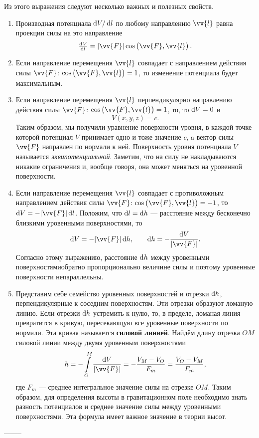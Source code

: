 \documentclass[11pt, a4paper]{article}
\theoremstyle{plain}
\theoremstyle{definition}
\theoremstyle{remark}
\begin{document}
Из этого выражения следуют несколько важных и полезных свойств.
\begin{enumerate}
    \item Производная потенциала $\dif V/ \dif l$ по любому направлению $\vv{l}$ равна проекции силы на
        это направление
        \begin{equation*}
            \od{V}{l} =  |\vv{F}|\cos \left(\vv{F}, \vv{l}\right).
        \end{equation*}
    \item Если направление перемещения $\vv{l}$ совпадает с направлением действия силы $\vv{F}$: $\cos\left( \vv{F}, \vv{l} \right) = 1$, то изменение потенциала будет максимальным.
    \item Если направление перемещения $\vv{l}$ перпендикулярно направлению действия силы $\vv{F}$: $\cos\left( \vv{F}, \vv{l} \right) = 1$, то, то $\dif V = 0$ и 
        \begin{equation*}
            V\left( x, y, z \right) = c.
        \end{equation*}
        Таким образом, мы получили уравнение поверхности уровня, в каждой точке которой потенциал $V$ принимает одно и тоже значение $c$, a вектор силы $\vv{F}$ направлен по нормали к ней. Поверхность уровня потенциала $V$ называется \textit{эквипотенциальной}. Заметим, что на силу не накладываются никакие ограничения и, вообще говоря, она может меняться на уровенной поверхности.
    \item Если направление перемещения $\vv{l}$ совпадает с противоложным направлением действия силы $\vv{F}$: $\cos\left( \vv{F}, \vv{l} \right) = -1$, то $\dif V = - |\vv{F}| \dif l$. Положим, что $\dif l = \dif h$ --- расстояние между бесконечно близкими уровенными поверхностями, то
        \begin{equation*}
            \dif V = - |\vv{F}| \dif h, \qquad \dif h = -\dfrac{\dif V}{|\vv{F}|}.     
        \end{equation*}
        Согласно этому выражению, расстояние $\dif h$ между уровенными поверхностямиобратно пропорционально величине силы и поэтому уровенные поверхности непараллельны.

	\item Представим себе семейство уровенных поверхностей и отрезки $\dif h$, перпендикулярные к соседним поверхностям. Эти отрезки образуют ломаную линию. Если отрезки $\dif h$ устремить к нулю, то, в пределе, ломаная линия превратится в кривую, пересекающую все уровенные поверхности по нормали. Эта кривая называется \textbf{силовой линией}. Найдём длину отрезка $OM$ силовой линии между двумя уровенным
        поверхностями
        \begin{equation*}
            h = -\int\limits_{O}^{M} \dfrac{\dif V}{|\vv{F}|} = - \dfrac{V_M - V_O}{F_m} =
            \dfrac{V_O - V_M}{F_m},
        \end{equation*}
        где $F_m$ --- среднее интегральное значение силы на отрезке $OM$. Таким образом, для
        определения высоты в гравитационном поле необходимо знать разность потенциалов и среднее
        значение силы между уровенными поверхностями. Эта формула имеет важное значение в теории
        высот.
\end{enumerate}
--------
\end{document}
